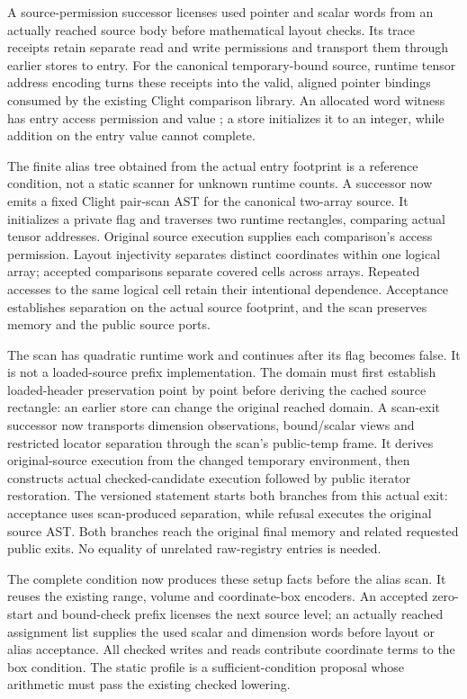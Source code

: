 A source-permission successor licenses used pointer and scalar words from an
actually reached source body before mathematical layout checks. Its trace
receipts retain separate read and write permissions and transport them through
earlier stores to entry. For the canonical temporary-bound source, runtime
tensor address encoding turns these receipts into the valid, aligned pointer
bindings consumed by the existing Clight comparison library. An allocated
word witness has entry access permission and value ; a store
initializes it to an integer, while addition on the entry value cannot complete.

The finite alias tree obtained from the actual entry footprint is a reference
condition, not a static scanner for unknown runtime counts. A successor now
emits a fixed Clight pair-scan AST for the canonical two-array source. It
initializes a private flag and traverses two runtime rectangles, comparing
actual tensor addresses. Original source execution supplies each comparison's
access permission. Layout injectivity separates distinct coordinates within
one logical array; accepted comparisons separate covered cells across arrays.
Repeated accesses to the same logical cell retain their intentional dependence.
Acceptance establishes separation on the actual source footprint, and the scan
preserves memory and the public source ports.

The scan has quadratic runtime work and continues after its flag becomes
false. It is not a loaded-source prefix implementation. The domain must first
establish loaded-header preservation point by point before deriving the cached
source rectangle: an earlier store can change the original reached domain.
A scan-exit successor now transports dimension observations, bound/scalar
views and restricted locator separation through the scan's public-temp frame.
It derives original-source execution from the changed temporary environment,
then constructs actual checked-candidate execution followed by public iterator
restoration. The versioned statement starts both branches from this actual
exit: acceptance uses scan-produced separation, while refusal executes the
original source AST. Both branches reach the original final memory and related
requested public exits. No equality of unrelated raw-registry entries is needed.

The complete condition now produces these setup facts before the alias scan.
It reuses the existing range, volume and coordinate-box encoders. An accepted
zero-start and bound-check prefix licenses the next source level; an actually
reached assignment list supplies the used scalar and dimension words before
layout or alias acceptance. All checked writes and reads contribute coordinate
terms to the box condition. The static profile is a sufficient-condition
proposal whose arithmetic must pass the existing checked lowering.


